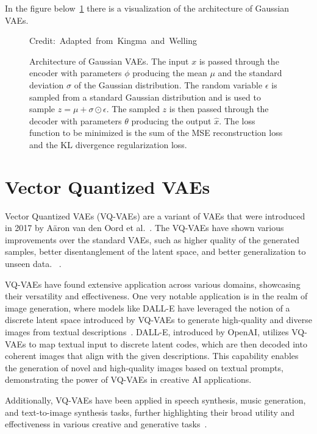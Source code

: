 In the figure below~\ref{VAEFigure} there is a visualization of the architecture of Gaussian VAEs.

\begin{figure}[H]
    \centering 
    
    \caption[Architecture of Gaussian VAEs.]%
    { Architecture of Gaussian VAEs. The input $x$ is passed through the encoder with parameters $\phi$ producing the mean $\mu$ and the standard deviation $\sigma$ of the Gaussian distribution. The random variable $\epsilon$ is sampled from a standard Gaussian distribution and is used to sample $ z = \mu + \sigma \odot \epsilon$. The sampled $z$ is then passed through the decoder with parameters $\theta$ producing the output $\hat{x}$. The loss function to be minimized is the sum of the MSE reconstruction loss and the KL divergence regularization loss. 
    }
  	\medskip 
	\hspace*{15pt}\hbox{\scriptsize Credit: Adapted from Kingma and Welling~\cite{Kingma_2019} }\label{VAEFigure}
\end{figure}

\section{Vector Quantized VAEs}\label{background:vqvae}

Vector Quantized VAEs (VQ-VAEs) are a variant of VAEs that were introduced in 2017 by Aäron van den Oord et al.~\cite{vqvae}. The VQ-VAEs have shown various improvements over the standard VAEs, such as higher quality of the generated samples, better disentanglement of the latent space, and better generalization to unseen data. ~\cite{vqvae}.

VQ-VAEs have found extensive application across various domains, showcasing their versatility and effectiveness. One very notable application is in the realm of image generation, where models like DALL-E have leveraged the notion of a discrete latent space introduced by VQ-VAEs to generate high-quality and diverse images from textual descriptions~\cite{dalle}. DALL-E, introduced by OpenAI, utilizes VQ-VAEs to map textual input to discrete latent codes, which are then decoded into coherent images that align with the given descriptions. This capability enables the generation of novel and high-quality images based on textual prompts, demonstrating the power of VQ-VAEs in creative AI applications.

Additionally, VQ-VAEs have been applied in speech synthesis, music generation, and text-to-image synthesis tasks, further highlighting their broad utility and effectiveness in various creative and generative tasks~\cite{vqvae2,vqvaespeechsynthesis, musicvqvae,dalle}.

